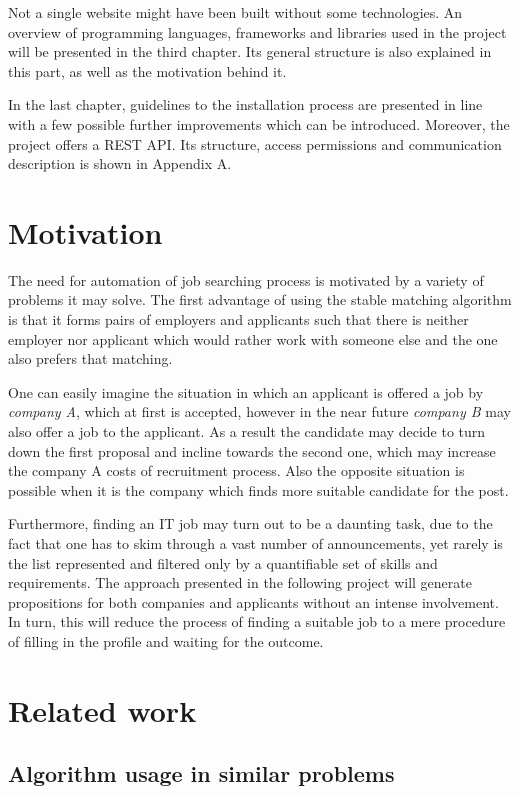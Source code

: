 Not a single website might have been built without some technologies. An overview of programming languages, frameworks and libraries used in the project will be presented in the third chapter. Its general structure is also explained in this part, as well as the motivation behind it.

In the last chapter, guidelines to the installation process are presented in line with a few possible further improvements which can be introduced. Moreover, the project offers a REST API. Its structure, access permissions and communication description is shown in Appendix A.

\section{Motivation}
The need for automation of job searching process is motivated by a variety of problems it may solve. The first advantage of using the stable matching algorithm is that it forms pairs of employers and applicants such that there is neither employer nor applicant which would rather work with someone else and the one also prefers that matching.

One can easily imagine the situation in which an applicant is offered a job by \textit{company A}, which at first is accepted, however in the near future \textit{company B} may also offer a job to the applicant. As a result the candidate may decide to turn down the first proposal and incline towards the second one, which may increase the company A costs of recruitment process. Also the opposite situation is possible when it is the company which finds more suitable candidate for the post.

Furthermore, finding an IT job may turn out to be a daunting task, due to the fact that one has to skim through a vast number of announcements, yet rarely is the list represented and filtered only by a quantifiable set of skills and requirements. The approach presented in the following project will generate propositions for both companies and applicants without an intense involvement. In turn, this will reduce the process of finding a suitable job to a mere procedure of filling in the profile and waiting for the outcome.

\section{Related work}
\subsection{Algorithm usage in similar problems}


